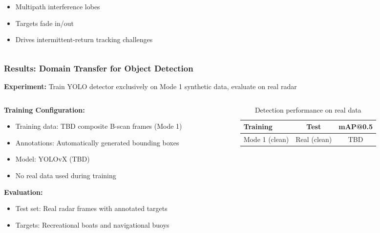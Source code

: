 \documentclass[aspectratio=169, 10pt]{beamer}
\begin{document}
\begin{frame}
\begin{columns}[T]
\begin{column}{0.48\textwidth}
      \begin{itemize}
        \item Multipath interference lobes
        \item Targets fade in/out
        \item Drives intermittent-return tracking challenges
      \end{itemize}
    \end{column}
  \end{columns}
\end{frame}

\begin{frame}
  \frametitle{Results: Domain Transfer for Object Detection}

  \small
  \textbf{Experiment:} Train YOLO detector exclusively on Mode 1 synthetic data, evaluate on real radar

  \vspace{0.3cm}
  \begin{columns}[T]
    \begin{column}{0.48\textwidth}
      \textbf{Training Configuration:}
      \setlength{\itemsep}{0pt}
      \begin{itemize}
        \item Training data: TBD composite B-scan frames (Mode 1)
        \item Annotations: Automatically generated bounding boxes
        \item Model: YOLOvX (TBD)
        \item No real data used during training
      \end{itemize}

      \vspace{0.2cm}
      \textbf{Evaluation:}
      \setlength{\itemsep}{0pt}
      \begin{itemize}
        \item Test set: Real radar frames with annotated targets
        \item Targets: Recreational boats and navigational buoys
      \end{itemize}
    \end{column}

    \begin{column}{0.48\textwidth}
      \begin{table}
        \centering
        \caption{Detection performance on real data}
        \scriptsize
        \begin{tabular}{@{}lcc@{}}
          \toprule
          \textbf{Training} & \textbf{Test} & \textbf{mAP@0.5} \\
          \midrule
          Mode 1 (clean) & Real (clean) & TBD \\
          \bottomrule
        \end{tabular}
      \end{table}


\end{column}
\end{columns}
\end{frame}
\end{document}
